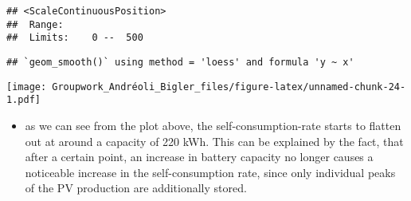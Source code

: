 \documentclass[
]{article}
\newenvironment{Shaded}{\begin{snugshade}}{\end{snugshade}}
\newcommand{\AttributeTok}[1]{\textcolor[rgb]{0.77,0.63,0.00}{#1}}
\newcommand{\DecValTok}[1]{\textcolor[rgb]{0.00,0.00,0.81}{#1}}
\newcommand{\FunctionTok}[1]{\textcolor[rgb]{0.00,0.00,0.00}{#1}}
\newcommand{\NormalTok}[1]{#1}
\newcommand{\OtherTok}[1]{\textcolor[rgb]{0.56,0.35,0.01}{#1}}
\newcommand{\SpecialCharTok}[1]{\textcolor[rgb]{0.00,0.00,0.00}{#1}}
\newcommand{\StringTok}[1]{\textcolor[rgb]{0.31,0.60,0.02}{#1}}
\providecommand{\tightlist}{%
  \setlength{\itemsep}{0pt}\setlength{\parskip}{0pt}}
\begin{document}
\begin{Shaded}
\end{Shaded}

\begin{verbatim}
## <ScaleContinuousPosition>
##  Range:  
##  Limits:    0 --  500
\end{verbatim}

\begin{verbatim}
## `geom_smooth()` using method = 'loess' and formula 'y ~ x'
\end{verbatim}

\texttt{[image: Groupwork\_Andréoli\_Bigler\_files/figure-latex/unnamed-chunk-24-1.pdf]}

\begin{itemize}
\tightlist
\item
  as we can see from the plot above, the self-consumption-rate starts to
  flatten out at around a capacity of 220 kWh. This can be explained by
  the fact, that after a certain point, an increase in battery capacity
  no longer causes a noticeable increase in the self-consumption rate,
  since only individual peaks of the PV production are additionally
  stored.
\end{itemize}
\end{document}
